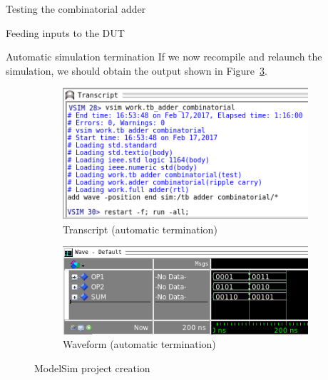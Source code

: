 \documentclass[lab]{course}
\begin{document}
\begin{section}{Testing the combinatorial adder}
\begin{subsection}{Feeding inputs to the DUT}
\begin{subsubsection}{Automatic simulation termination}
            If we now recompile and relaunch the simulation, we should obtain the output shown in Figure~\ref{fig:waveform_combinatorial_process_automatically_terminates}.

            \begin{figure}[!h]
                \centering
                \begin{subfigure}[t]{0.4\textwidth}
                    \centering
                    \includegraphics[width=1.0\textwidth]{figs/waveform_combinatorial_transcript_automatic_termination.png}
                    \caption{Transcript (automatic termination)}
                    \label{fig:waveform_combinatorial_transcript_automatically_terminates}
                \end{subfigure}
                \hspace{1em}
                \begin{subfigure}[t]{0.55\textwidth}
                    \centering
                    \includegraphics[width=1.0\textwidth]{figs/waveform_combinatorial_process_automatic_termination.png}
                    \caption{Waveform (automatic termination)}
                    \label{fig:waveform_combinatorial_process_automatically_terminates}
                \end{subfigure}
                \caption{ModelSim project creation}
            \end{figure}
        \end{subsubsection}


\end{subsection}
\end{section}
\end{document}
